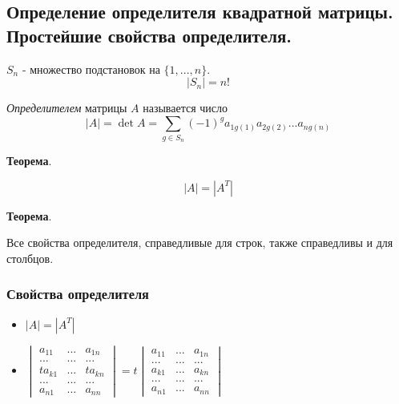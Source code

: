 \documentclass[a4paper]{article}
\begin{document}
\subsection*{Определение определителя квадратной матрицы. Простейшие свойства определителя.}
$S_n$ - множество подстановок на $\{ 1, ..., n\}$.
\[ |S_n| = n! \]

\textit{Определителем} матрицы $A$ называется число 
\[ |A| = \det A = \sum_{g \in S_n} (-1)^g a_{1 g(1)} a_{2 g(2)} ... a_{n g(n)} \]


\begin{htheorem}\textbf{Теорема}.

\[ |A| = |A^T| \]
\end{htheorem}

\begin{htheorem}\textbf{Теорема}.

Все свойства определителя, справедливые для строк, также справедливы и для столбцов.


\subsubsection*{Свойства определителя}
\begin{itemize}
\item $|A| = |A^T|$
\item $\begin{vmatrix}
a_{11} & ... & a_{1n} \\ ... & ... & ... \\ ta_{k1} & ... & ta_{kn} \\ ... & ... & ... \\ a_{n1} & ... & a_{nn}
\end{vmatrix} = t \begin{vmatrix}
a_{11} & ... & a_{1n} \\ ... & ... & ... \\ a_{k1} & ... & a_{kn} \\ ... & ... & ... \\ a_{n1} & ... & a_{nn}
\end{vmatrix}$
\end{itemize}
\end{htheorem}
\end{document}
